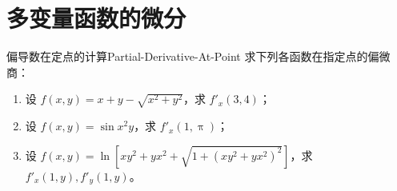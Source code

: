 \section{多变量函数的微分}

\begin{problem}{偏导数在定点的计算}{Partial-Derivative-At-Point}
    求下列各函数在指定点的偏微商：
    \begin{enumerate}
        \item 设 $f(x,y) = x + y - \sqrt{x^2 + y^2}$，求 $f'_x(3,4)$；
        \item 设 $f(x,y) = \sin x^2 y$，求 $f'_x(1, \uppi)$；
        \item 设 $f(x,y) = \ln[xy^2 + yx^2 + \sqrt{1 + (xy^2 + yx^2)^2}]$，求 $f'_x(1, y), f'_y(1, y)$。
    \end{enumerate}
\end{problem}

